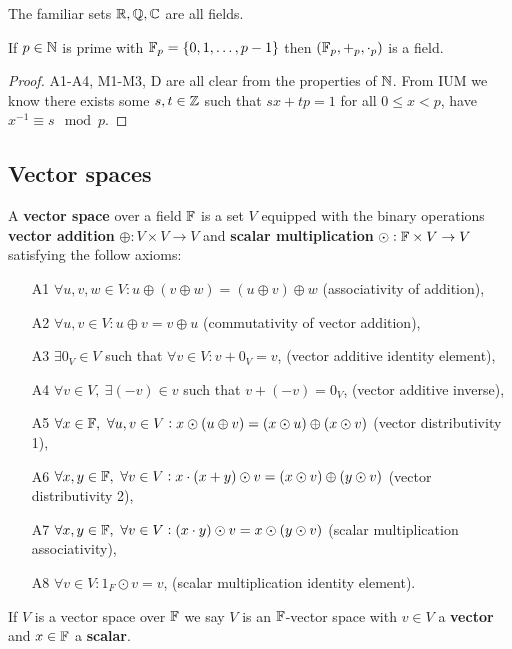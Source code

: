 \documentclass[../Year1.tex]{subfiles}
\begin{document}
\begin{example}
    The familiar sets $\mathbb{R}, \mathbb{Q}, \mathbb{C}$ are all fields.
\end{example}

\begin{theorem}
    If $p\in\mathbb{N}$ is prime with $\mathbb{F}_p = \{0,1,\ldots,p-1\}$ then $(\mathbb{F}_p,+_p,\cdot_p)$ is a field.
    \begin{proof}
        A1-A4, M1-M3, D are all clear from the properties of $\mathbb{N}$. From IUM we know there exists some $s,t\in\mathbb{Z}$ such that $sx+tp=1$ for all $0\leq x<p$, have $x^{-1}\equiv s \mod{p}$.
    \end{proof}
\end{theorem}

\subsection{Vector spaces}
\begin{definition}
    A \textbf{vector space} over a field $\mathbb{F}$ is a set $V$ equipped with the binary operations \textbf{vector addition} $\oplus:V\times V\rightarrow V$ and \textbf{scalar multiplication} $\odot:\mathbb{F}\times V\rightarrow V$ satisfying the follow axioms:
    \begin{enumerate}
        \item[A1] $\forall u,v,w \in V: u\oplus(v\oplus w)=(u\oplus v)\oplus w$ (associativity of addition),
        \item[A2] $\forall u,v \in V: u\oplus v=v\oplus u$ (commutativity of vector addition),
        \item[A3] $\exists 0_V \in V$ such that $\forall v\in V: v + 0_V = v$, (vector additive identity element),
        \item[A4] $\forall v\in V, \ \exists (-v)\in v$ such that $v+(-v)=0_V$, (vector additive inverse),

        \item[A5] $\forall x \in \mathbb{F}, \ \forall u,v\in V: x \odot (u\oplus v) =(x\odot u) \oplus (x\odot v)$ (vector distributivity 1),
        \item[A6] $\forall x,y \in \mathbb{F}, \ \forall v\in V: x\cdot (x+y)\odot v =(x\odot v) \oplus (y\odot v)$ (vector distributivity 2),
        \item[A7] $\forall x,y \in \mathbb{F}, \ \forall v\in V: (x\cdot y)\odot v = x\odot (y\odot v)$ (scalar multiplication associativity),
        \item[A8] $\forall v\in V: 1_F\odot v = v$, (scalar multiplication identity element).
    \end{enumerate}
    If $V$ is a vector space over $\mathbb{F}$ we say $V$ is an $\mathbb{F}$-vector space with $v\in V$ a \textbf{vector} and $x\in\mathbb{F}$ a \textbf{scalar}.
\end{definition}
\end{document}
